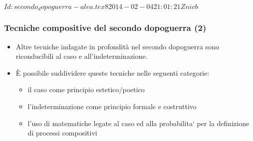 %
%
\svnInfo $Id: secondo_dopoguerra-alea.tex 8 2014-02-04 21:01:21Z nicb $

\setcounter{ms}{0}
\begin{frame}
    \frametitle{Tecniche compositive del secondo dopoguerra (2)}

    \begin{itemize}

        \item Altre tecniche indagate in profondit\`a
            nel secondo dopoguerra sono riconducibili
            al caso e all'indeterminazione.

        \item \`E possibile suddividere queste tecniche
            nelle seguenti categorie:

        \begin{itemize}

            \item il caso come principio estetico/poetico

            \item l'indeterminazione come principio formale e costruttivo

            \item l'uso di matematiche legate al caso ed alla probabilita`
                per la definizione di processi compositivi

        \end{itemize}

    \end{itemize}

\end{frame}
